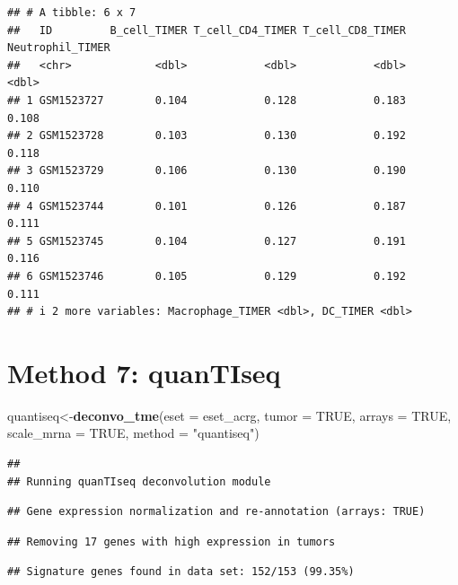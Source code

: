 \documentclass[
  12pt,
]{book}
\newenvironment{Shaded}{\begin{snugshade}}{\end{snugshade}}
\newcommand{\AttributeTok}[1]{\textcolor[rgb]{0.13,0.29,0.53}{#1}}
\newcommand{\ConstantTok}[1]{\textcolor[rgb]{0.56,0.35,0.01}{#1}}
\newcommand{\FunctionTok}[1]{\textcolor[rgb]{0.13,0.29,0.53}{\textbf{#1}}}
\newcommand{\NormalTok}[1]{#1}
\newcommand{\OtherTok}[1]{\textcolor[rgb]{0.56,0.35,0.01}{#1}}
\newcommand{\StringTok}[1]{\textcolor[rgb]{0.31,0.60,0.02}{#1}}
\theoremstyle{definition}
\theoremstyle{definition}
\theoremstyle{definition}
\theoremstyle{definition}
\theoremstyle{remark}
\begin{document}
\begin{verbatim}
## # A tibble: 6 x 7
##   ID         B_cell_TIMER T_cell_CD4_TIMER T_cell_CD8_TIMER Neutrophil_TIMER
##   <chr>             <dbl>            <dbl>            <dbl>            <dbl>
## 1 GSM1523727        0.104            0.128            0.183            0.108
## 2 GSM1523728        0.103            0.130            0.192            0.118
## 3 GSM1523729        0.106            0.130            0.190            0.110
## 4 GSM1523744        0.101            0.126            0.187            0.111
## 5 GSM1523745        0.104            0.127            0.191            0.116
## 6 GSM1523746        0.105            0.129            0.192            0.111
## # i 2 more variables: Macrophage_TIMER <dbl>, DC_TIMER <dbl>
\end{verbatim}

\hypertarget{method-7-quantiseq}{%
\section{Method 7: quanTIseq}\label{method-7-quantiseq}}

\begin{Shaded}
\begin{Highlighting}[]
\NormalTok{quantiseq}\OtherTok{\textless{}{-}}\FunctionTok{deconvo\_tme}\NormalTok{(}\AttributeTok{eset =}\NormalTok{ eset\_acrg, }\AttributeTok{tumor =} \ConstantTok{TRUE}\NormalTok{, }\AttributeTok{arrays =} \ConstantTok{TRUE}\NormalTok{, }\AttributeTok{scale\_mrna =} \ConstantTok{TRUE}\NormalTok{, }\AttributeTok{method =} \StringTok{"quantiseq"}\NormalTok{)}
\end{Highlighting}
\end{Shaded}

\begin{verbatim}
## 
## Running quanTIseq deconvolution module
\end{verbatim}

\begin{verbatim}
## Gene expression normalization and re-annotation (arrays: TRUE)
\end{verbatim}

\begin{verbatim}
## Removing 17 genes with high expression in tumors
\end{verbatim}

\begin{verbatim}
## Signature genes found in data set: 152/153 (99.35%)
\end{verbatim}
\end{document}
